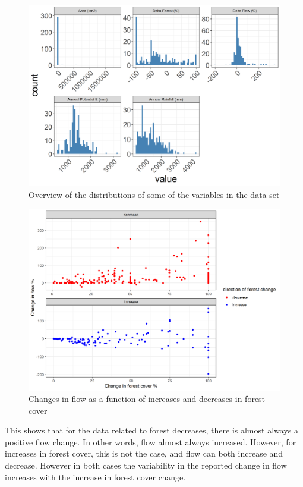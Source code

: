 \documentclass[]{elsarticle} %
\begin{document}
\begin{figure}
\includegraphics[width=0.9\linewidth]{DataExploration} \caption{Overview of the distributions of some of the variables in the data set}\label{fig:data_graphs}
\end{figure}

\begin{figure}
\includegraphics[width=0.9\linewidth]{Increase_decrease} \caption{Changes in flow as a function of increases and decreases in forest cover}\label{fig:increase_decrease}
\end{figure}

This shows that for the data related to forest decreases, there is
almost always a positive flow change. In other words, flow almost always
increased. However, for increases in forest cover, this is not the case,
and flow can both increase and decrease. However in both cases the
variability in the reported change in flow increases with the increase
in forest cover change.
\end{document}
